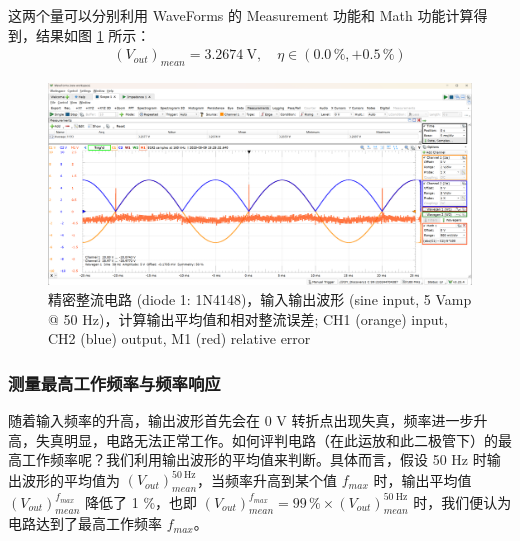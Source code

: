 \documentclass[UTF8]{article}
\begin{document}
\noindent 这两个量可以分别利用 WaveForms 的 Measurement 功能和 Math 功能计算得到，结果如图 \ref{1N4148 input-output waveform (50 Hz) 1} 所示：
\begin{gather}
(V_{out})_{mean} = 3.2674 \ \mathrm{V},\quad
\eta \in (0.0\, \%, +0.5\, \%)
\end{gather}
\vspace*{-3mm}
\begin{figure}[H]\centering
    \includegraphics[width=\columnwidth]{LCE-05-精密整流/assets/1N4148/1N4148 input-output waveform (50 Hz) 1.png}
    \caption{精密整流电路 (diode 1: 1N4148)，输入输出波形 (sine input, 5 Vamp @ 50 Hz)，计算输出平均值和相对整流误差; CH1 (orange) input, CH2 (blue) output, M1 (red) relative error}
    \label{1N4148 input-output waveform (50 Hz) 1}
\end{figure}

\newpage
\vspace*{-13mm}
\subsubsection{测量最高工作频率与频率响应}

随着输入频率的升高，输出波形首先会在 0 V 转折点出现失真，频率进一步升高，失真明显，电路无法正常工作。如何评判电路（在此运放和此二极管下）的最高工作频率呢？我们利用输出波形的平均值来判断。具体而言，假设 50 Hz 时输出波形的平均值为 $(V_{out})_{mean}^{\mathrm{50\ Hz}}$，当频率升高到某个值 $f_{max}$ 时，输出平均值 $(V_{out})_{mean}^{f_{max}}$ 降低了 1 \%，也即 $(V_{out})_{mean}^{f_{max}} = 99\,\% \times (V_{out})_{mean}^{\mathrm{50\ Hz}}$ 时，我们便认为电路达到了最高工作频率 $f_{max}$。
\end{document}
